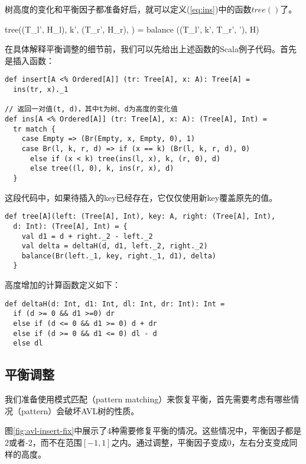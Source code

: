 \documentclass[UTF8]{article}
\begin{document}
树高度的变化和平衡因子都准备好后，就可以定义(\ref{eq:ins})中的函数$tree()$了。

\be
tree((T_l', \Delta H_l), k', (T_r', \Delta H_r), \Delta) =
  balance ((T_l', k', T_r', \Delta'), \Delta H)
\ee

在具体解释平衡调整的细节前，我们可以先给出上述函数的Scala例子代码。首先是插入函数：

\lstset{language=Scala}
\begin{lstlisting}
def insert[A <% Ordered[A]] (tr: Tree[A], x: A): Tree[A] =
  ins(tr, x)._1

// 返回一对值(t, d)，其中t为树、d为高度的变化值
def ins[A <% Ordered[A]] (tr: Tree[A], x: A): (Tree[A], Int) =
  tr match {
    case Empty => (Br(Empty, x, Empty, 0), 1)
    case Br(l, k, r, d) => if (x == k) (Br(l, k, r, d), 0)
      else if (x < k) tree(ins(l, x), k, (r, 0), d)
      else tree((l, 0), k, ins(r, x), d)
  }
\end{lstlisting}

这段代码中，如果待插入的key已经存在，它仅仅使用新key覆盖原先的值。

\begin{lstlisting}
def tree[A](left: (Tree[A], Int), key: A, right: (Tree[A], Int),
  d: Int): (Tree[A], Int) = {
    val d1 = d + right._2 - left._2
    val delta = deltaH(d, d1, left._2, right._2)
    balance(Br(left._1, key, right._1, d1), delta)
  }
\end{lstlisting}

高度增加的计算函数定义如下：

\begin{lstlisting}
def deltaH(d: Int, d1: Int, dl: Int, dr: Int): Int =
  if (d >= 0 && d1 >=0) dr
  else if (d <= 0 && d1 >= 0) d + dr
  else if (d >= 0 && d1 <= 0) dl - d
  else dl
\end{lstlisting}

\subsection{平衡调整}
我们准备使用模式匹配（pattern matching）来恢复平衡，首先需要考虑有哪些情况（pattern）会破坏AVL树的性质。

图\ref{fig:avl-insert-fix}中展示了4种需要修复平衡的情况。这些情况中，平衡因子都是2或者-2，而不在范围$[-1, 1]$之内。通过调整，平衡因子变成0，左右分支变成同样的高度。
\end{document}
